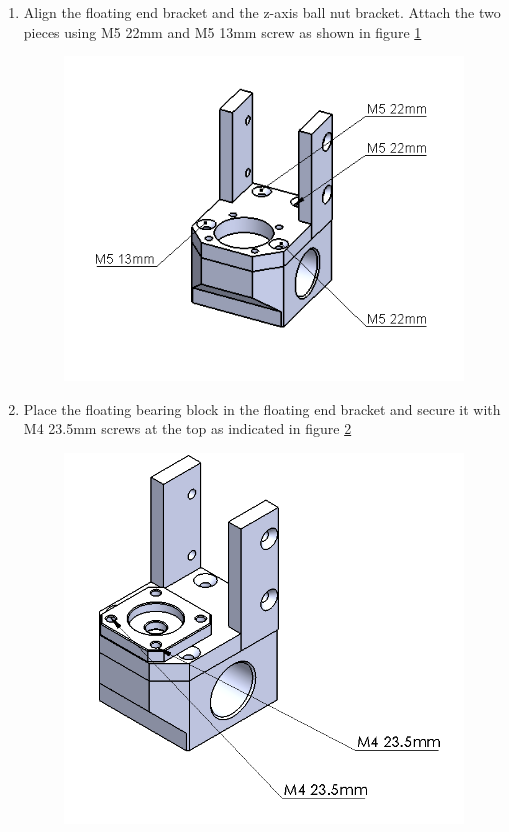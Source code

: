 \begin{enumerate}

\item Align the floating end bracket and the z-axis ball nut bracket. Attach the two pieces using M5 22mm and M5 13mm screw as shown in figure \ref{fig:yaxis3}


\begin{figure}
    \centering
    \includegraphics[scale=0.6]{Platforms/figs/yaxis3.png}
    \caption{\label{fig:yaxis3}}
\end{figure}

\item Place the floating bearing block in the floating end bracket and secure it with M4 23.5mm screws at the top as indicated in figure \ref{fig:yaxis4}

\begin{figure}
    \centering
    \includegraphics[scale=0.4]{Platforms/figs/yaxis4.png}
    \caption{\label{fig:yaxis4}}
\end{figure}


\end{enumerate}

